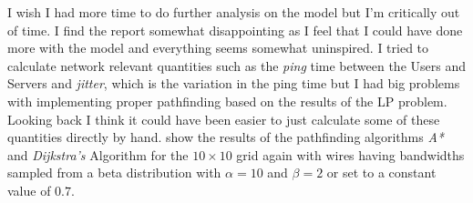 \documentclass[10pt, titlepage, a4paper]{article}
\begin{document}
I wish I had more time to do further analysis on the model but I'm critically out of time. I find the report somewhat disappointing
as I feel that I could have done more with the model and everything seems somewhat uninspired. I tried to calculate network relevant 
quantities such as the \textit{ping} time between the Users and Servers and \textit{jitter}, which is the variation in the ping time but 
I had big problems with implementing proper pathfinding based on the results of the LP problem. Looking back I think it could have been easier to 
just calculate some of these quantities directly by hand. \textcolor{red}{} show the results of the pathfinding
algorithms \textit{A*} \cite{astar} and \textit{Dijkstra's} Algorithm \cite{dijkstra} for the $10\times 10$ grid again with wires having bandwidths sampled from a beta distribution with $\alpha = 10$ and $\beta = 2$
or set to a constant value of $0.7$. 
\end{document}
